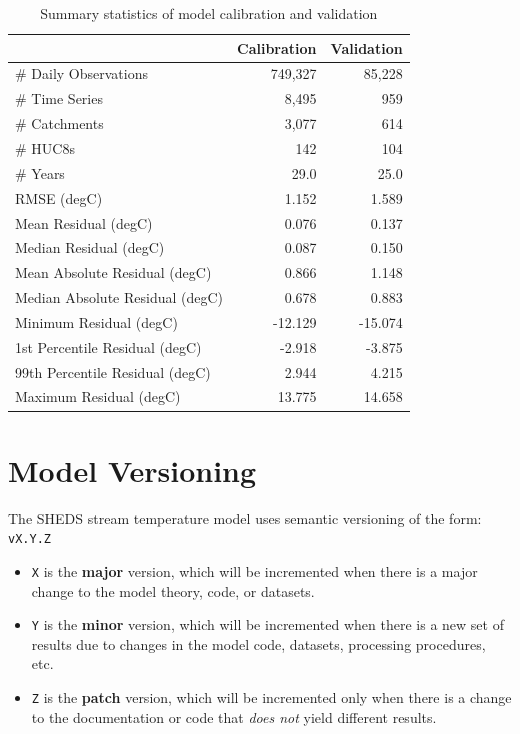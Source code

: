\documentclass[]{book}
\providecommand{\tightlist}{%
  \setlength{\itemsep}{0pt}\setlength{\parskip}{0pt}}
\begin{document}
\begin{table}

\caption{\label{tab:table-intro-gof}Summary statistics of model calibration and validation}
\centering
\begin{tabular}[t]{l|r|r}
\hline
 & Calibration & Validation\\
\hline
\# Daily Observations & 749,327 & 85,228\\
\hline
\# Time Series & 8,495 & 959\\
\hline
\# Catchments & 3,077 & 614\\
\hline
\# HUC8s & 142 & 104\\
\hline
\# Years & 29.0 & 25.0\\
\hline
RMSE (degC) & 1.152 & 1.589\\
\hline
Mean Residual (degC) & 0.076 & 0.137\\
\hline
Median Residual (degC) & 0.087 & 0.150\\
\hline
Mean Absolute Residual (degC) & 0.866 & 1.148\\
\hline
Median Absolute Residual (degC) & 0.678 & 0.883\\
\hline
Minimum Residual (degC) & -12.129 & -15.074\\
\hline
1st Percentile Residual (degC) & -2.918 & -3.875\\
\hline
99th Percentile Residual (degC) & 2.944 & 4.215\\
\hline
Maximum Residual (degC) & 13.775 & 14.658\\
\hline
\end{tabular}
\end{table}

\hypertarget{model-versioning}{%
\section{Model Versioning}\label{model-versioning}}

The SHEDS stream temperature model uses semantic versioning of the form: \texttt{vX.Y.Z}

\begin{itemize}
\tightlist
\item
  \texttt{X} is the \textbf{major} version, which will be incremented when there is a major change to the model theory, code, or datasets.
\item
  \texttt{Y} is the \textbf{minor} version, which will be incremented when there is a new set of results due to changes in the model code, datasets, processing procedures, etc.
\item
  \texttt{Z} is the \textbf{patch} version, which will be incremented only when there is a change to the documentation or code that \emph{does not} yield different results.
\end{itemize}
\end{document}
